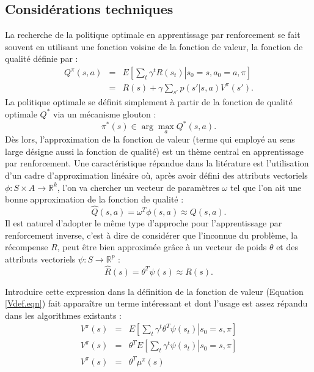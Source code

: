 \documentclass[publibook-draft]{CAp2012}
\begin{document}
\subsection{Considérations techniques}
\label{ConsiderationsTechniques.sec}
La recherche de la politique optimale en apprentissage par renforcement se fait souvent en utilisant une fonction voisine de la fonction de valeur, la fonction de qualité définie par :
\begin{eqnarray}
Q^\pi(s,a) &=& E\left[\left.\sum_t\gamma^tR(s_t)\right|s_0=s,a_0=a,\pi\right]\\
&=& R(s) + \gamma\sum_{s'}p(s'|s,a)V^\pi(s').
\end{eqnarray}
La politique optimale se définit simplement à partir de la fonction de qualité optimale $Q^*$ via un mécanisme glouton :
\begin{equation}
\label{greedy.eqn}
\pi^*(s) \in \arg\max_a Q^*(s,a).
\end{equation}
Dès lors, l'approximation de la fonction de valeur (terme qui employé au sens large désigne aussi la fonction de qualité) est un thème central en apprentissage par renforcement. Une caractéristique répandue dans la litérature est l'utilisation d'un cadre d'approximation linéaire où, après avoir défini des attributs vectoriels $\phi: S\times A \rightarrow \mathbb{R}^k$, l'on va chercher un vecteur de paramètres $\omega$ tel que l'on ait une bonne approximation de la fonction de qualité :
\begin{equation}
\hat Q (s,a) = \omega^T\phi(s,a)\approx Q(s,a).
\end{equation}
Il est naturel d'adopter le même type d'approche pour l'apprentissage par renforcement inverse, c'est à dire de considérer que l'inconnue du problème, la récompense $R$, peut être bien approximée grâce à un vecteur de poids $\theta$ et des attributs vectoriels $\psi : S\rightarrow \mathbb{R}^p$ :
\begin{equation}
\label{hatRdef.eqn}
\hat R(s) = \theta^T\psi(s)\approx R(s).
\end{equation}

Introduire cette expression dans la définition de la fonction de valeur (Equation \eqref{Vdef.eqn}) fait apparaître un terme intéressant et dont l'usage est assez répandu dans les algorithmes existants :
\begin{eqnarray}
V^\pi(s) &=& E\left[\left.\sum_t\gamma^t\theta^T\psi(s_t)\right|s_0=s,\pi\right]\\
V^\pi(s) &=& \theta^TE\left[\left.\sum_t\gamma^t\psi(s_t)\right|s_0=s,\pi\right]\\
V^\pi(s) &=& \theta^T\mu^\pi(s)
\label{Vmu.eqn}
\end{eqnarray}
\end{document}
